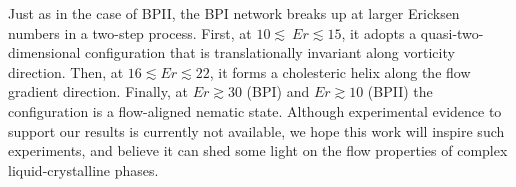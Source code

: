 \documentclass[8.5pt,twoside,twocolumn]{article}
\begin{document}
Just as in the case of BPII, the BPI network breaks up at larger Ericksen numbers in
a two-step process. First, at $10\lesssim\ Er\lesssim 15$, it adopts a 
quasi-two-dimensional configuration that is translationally invariant along vorticity direction. 
Then, at $16\lesssim Er \lesssim 22$, it forms a cholesteric helix along the flow gradient 
direction.  Finally, at $Er\gtrsim30$ (BPI) and $Er\gtrsim10$ (BPII) the configuration
is a flow-aligned nematic state.
Although experimental evidence to support
our results is currently not available, we hope this work will inspire such experiments, and believe it can shed some light 
on the flow properties of complex liquid-crystalline phases.


%


\end{document}
